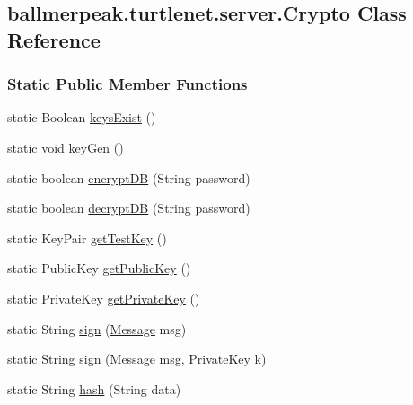 \hypertarget{classballmerpeak_1_1turtlenet_1_1server_1_1Crypto}{\subsection{ballmerpeak.\-turtlenet.\-server.\-Crypto Class Reference}
\label{classballmerpeak_1_1turtlenet_1_1server_1_1Crypto}
}
\subsubsection*{Static Public Member Functions}
\begin{DoxyCompactItemize}
\item 
static Boolean \hyperlink{classballmerpeak_1_1turtlenet_1_1server_1_1Crypto_a4d363a946bc16a383bb3516a6819e06f}{keys\-Exist} ()
\item 
static void \hyperlink{classballmerpeak_1_1turtlenet_1_1server_1_1Crypto_ae3a1070020af2f98bfb23284115f1b97}{key\-Gen} ()
\item 
static boolean \hyperlink{classballmerpeak_1_1turtlenet_1_1server_1_1Crypto_a028cefbca14291fa686b27c36f3b212a}{encrypt\-D\-B} (String password)
\item 
static boolean \hyperlink{classballmerpeak_1_1turtlenet_1_1server_1_1Crypto_a0faed916bbc35f2f01c4a09a52c008df}{decrypt\-D\-B} (String password)
\item 
static Key\-Pair \hyperlink{classballmerpeak_1_1turtlenet_1_1server_1_1Crypto_a2e95210ca85eb6273d47a1bde6be22e4}{get\-Test\-Key} ()
\item 
static Public\-Key \hyperlink{classballmerpeak_1_1turtlenet_1_1server_1_1Crypto_a830f62b5e45e6d1f424c3340b80d90c2}{get\-Public\-Key} ()
\item 
static Private\-Key \hyperlink{classballmerpeak_1_1turtlenet_1_1server_1_1Crypto_af6bfe6ea68cff3020c22221361f2d7f2}{get\-Private\-Key} ()
\item 
static String \hyperlink{classballmerpeak_1_1turtlenet_1_1server_1_1Crypto_a3551509d86a909950bb4c44ae1803240}{sign} (\hyperlink{classballmerpeak_1_1turtlenet_1_1shared_1_1Message}{Message} msg)
\item 
static String \hyperlink{classballmerpeak_1_1turtlenet_1_1server_1_1Crypto_aaa857c040134654c8d6187cb4f4090b5}{sign} (\hyperlink{classballmerpeak_1_1turtlenet_1_1shared_1_1Message}{Message} msg, Private\-Key k)
\item 
static String \hyperlink{classballmerpeak_1_1turtlenet_1_1server_1_1Crypto_a359e1b82e7bf6ff8018bed7829850def}{hash} (String data)

\end{DoxyCompactItemize}
